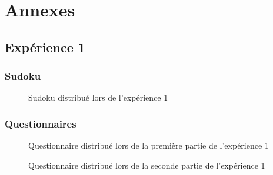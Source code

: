 \documentclass[12pt,fleqn,oneside,french,openany]{book} %
\begin{document}
\vfill
\begin{figure}[b] 
\end{figure}





\appendix
\chapter{Annexes} \label{cha:annexes}
\section*{Expérience 1}

\subsection*{Sudoku} \label{sec:Sudoku}
\begin{figure}[htp]  %
	\caption{Sudoku distribué lors de l'expérience 1}
\end{figure}  

\clearpage
\subsection*{Questionnaires} \label{sec:Questionnaires}
\begin{figure}[htp] 
	\caption{Questionnaire distribué lors de la première partie de l'expérience 1}
\end{figure}

\clearpage
\begin{figure}[htp] 
	\caption{Questionnaire distribué lors de la seconde partie de l'expérience 1}
\end{figure}
\end{document}
